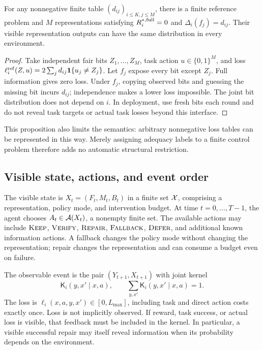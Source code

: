 \begin{proposition}
\label{prop:realize}
For any nonnegative finite table $(d_{ij})_{i\le K,j\le M}$, there is a finite
reference problem and $M$ representations satisfying
$R_i^{*,{\rm full}}=0$ and $\Delta_i(f_j)=d_{ij}$. Their visible representation
outputs can have the same distribution in every environment.
\end{proposition}
\begin{proof}
Take independent fair bits $Z_1,\ldots,Z_M$, task action
$u\in\{0,1\}^M$, and loss
$\ell_i^{\rm ref}(Z,u)=2\sum_jd_{ij}\mathbf 1\{u_j\ne Z_j\}$.
Let $f_j$ expose every bit except $Z_j$. Full information gives zero loss.
Under $f_j$, copying observed bits and guessing the missing bit incurs $d_{ij}$;
independence makes a lower loss impossible. The joint bit distribution does not
depend on $i$. In deployment, use fresh bits each round and do not reveal task
targets or actual task losses beyond this interface.
\end{proof}
This proposition also limits the semantics: arbitrary nonnegative loss tables
can be represented in this way. Merely assigning adequacy labels to a finite
control problem therefore adds no automatic structural restriction.

\subsection{Visible state, actions, and event order}
The visible state is $X_t=(F_t,M_t,B_t)$ in a finite set $\mathcal X$, comprising a
representation, policy mode, and intervention budget. At time
$t=0,\ldots,T-1$, the agent chooses $A_t\in\mathcal A(X_t)$, a nonempty finite set.
The available actions may include $\textsc{Keep}$, $\textsc{Verify}$, $\textsc{Repair}$,
$\textsc{Fallback}$, $\textsc{Defer}$, and additional known information actions.
A fallback changes the policy mode without changing the representation; repair
changes the representation and can consume a budget even on failure.

The observable event is the pair $(Y_{t+1},X_{t+1})$ with joint kernel
\begin{equation}
\mathsf K_i(y,x'\mid x,a),\qquad
\sum_{y,x'}\mathsf K_i(y,x'\mid x,a)=1.
\end{equation}
The loss is $\ell_i(x,a,y,x')\in[0,L_{\max}]$, including task and direct action
costs exactly once. Loss is not implicitly observed. If reward, task success,
or actual loss is visible, that feedback must be included in the kernel.
In particular, a visible successful repair may itself reveal information when
its probability depends on the environment.

